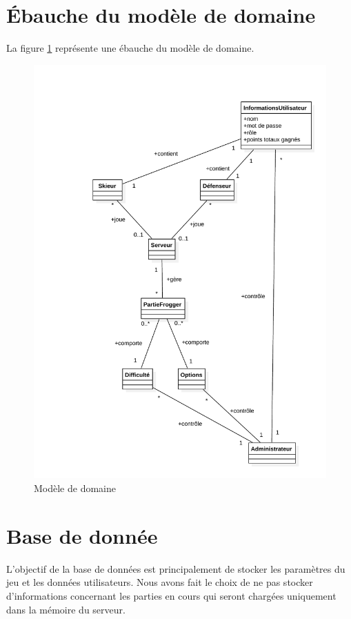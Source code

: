 \documentclass[a4paper,11pt]{article}
\begin{document}
	\section{Ébauche du modèle de domaine}
	La figure \ref{model_domain} représente une ébauche du modèle de domaine.

	\begin{figure}[!ht]
		\centering
		\includegraphics[scale=0.6]{../Schemas/model_domain.pdf}
		\caption{Modèle de domaine}
		\label{model_domain}
	\end{figure}

	\section{Base de donnée}
	L'objectif de la base de données est principalement de stocker les paramètres du jeu et les données utilisateurs. Nous avons fait le choix de ne pas stocker d'informations concernant les parties en cours qui seront chargées uniquement dans la mémoire du serveur. \par
\end{document}
